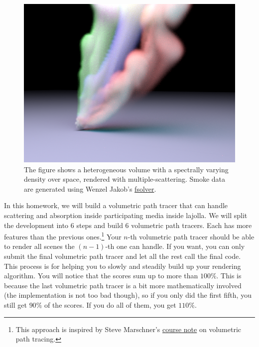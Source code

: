 




\begin{figure}[h]
    \includegraphics[width=\linewidth]{imgs/colored_smoke.png}
    \caption{The figure shows a heterogeneous volume with a spectrally varying density over space, rendered with multiple-scattering. Smoke data are generated using Wenzel Jakob's \href{http://www.mitsuba-renderer.org/misc.html}{fsolver}.}
    \label{fig:gallery}
\end{figure}

In this homework, we will build a volumetric path tracer that can handle scattering and absorption inside participating media inside lajolla. We will split the development into 6 steps and build 6 volumetric path tracers. Each has more features than the previous ones.\footnote{This approach is inspired by Steve Marschner's \href{https://www.cs.cornell.edu/courses/cs6630/2015fa/notes/10volpath.pdf}{course note} on volumetric path tracing.} Your $n$-th volumetric path tracer should be able to render all scenes the $(n-1)$-th one can handle. If you want, you can only submit the final volumetric path tracer and let all the rest call the final code. This process is for helping you to slowly and steadily build up your rendering algorithm. You will notice that the scores sum up to more than $100\%$. This is because the last volumetric path tracer is a bit more mathematically involved (the implementation is not too bad though), so if you only did the first fifth, you still get $90\%$ of the scores. If you do all of them, you get $110\%$.

